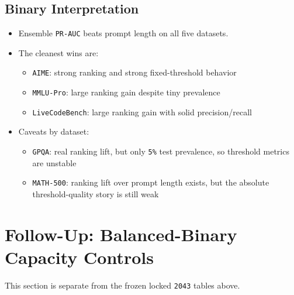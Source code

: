 \documentclass[11pt]{article}
\begin{document}
\subsection*{Binary Interpretation}
\begin{itemize}[leftmargin=1.5em]
\item Ensemble \texttt{PR-AUC} beats prompt length on all five datasets.
\item The cleanest wins are:
  \begin{itemize}[leftmargin=1.5em]
  \item \texttt{AIME}: strong ranking and strong fixed-threshold behavior
  \item \texttt{MMLU-Pro}: large ranking gain despite tiny prevalence
  \item \texttt{LiveCodeBench}: large ranking gain with solid precision/recall
  \end{itemize}
\item Caveats by dataset:
  \begin{itemize}[leftmargin=1.5em]
  \item \texttt{GPQA}: real ranking lift, but only \texttt{5\%} test prevalence, so threshold metrics are unstable
  \item \texttt{MATH-500}: ranking lift over prompt length exists, but the absolute threshold-quality story is still weak
  \end{itemize}
\end{itemize}

\section*{Follow-Up: Balanced-Binary Capacity Controls}
This section is separate from the frozen locked \texttt{2043} tables above.
\end{document}
